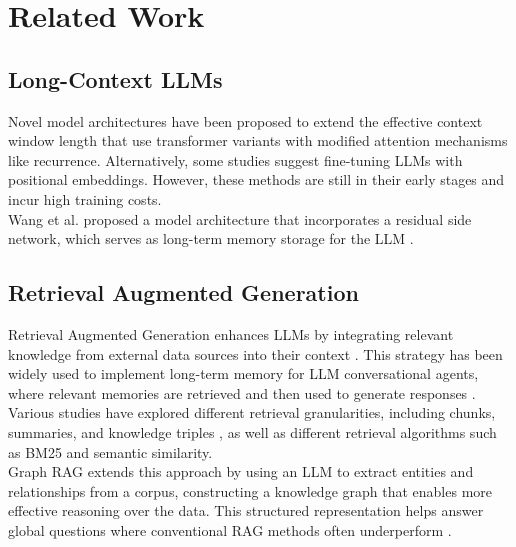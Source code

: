 \cleardoublepage
\chapter{Related Work}
\label{ch:relatedwork}
\label{ch:chapter2}

\section{Long-Context LLMs}

Novel model architectures have been proposed to extend the effective context window length that use transformer variants with modified attention mechanisms like recurrence. Alternatively, some studies suggest fine-tuning LLMs with positional embeddings. However, these methods are still in their early stages and incur high training costs. \\

\noindent Wang et al. proposed a model architecture that incorporates a residual side network, which serves as long-term memory storage for the LLM \cite{wang2023augmentinglanguagemodelslongterm}.

\section{Retrieval Augmented Generation}

Retrieval Augmented Generation enhances LLMs by integrating relevant knowledge from external data sources into their context \cite{lewis2021retrievalaugmentedgenerationknowledgeintensivenlp}. This strategy has been widely used to implement long-term memory for LLM conversational agents, where relevant memories are retrieved and then used to generate responses \cite{zeng2024structuralmemoryllmagents}. \\ 

\noindent Various studies have explored different retrieval granularities, including chunks, summaries, and knowledge triples \cite{zeng2024structuralmemoryllmagents}, as well as different retrieval algorithms such as BM25 and semantic similarity.\\

\noindent Graph RAG extends this approach by using an LLM to extract entities and relationships from a corpus, constructing a knowledge graph that enables more effective reasoning over the data. This structured representation helps answer global questions where conventional RAG methods often underperform \cite{edge2024localglobalgraphrag}.
